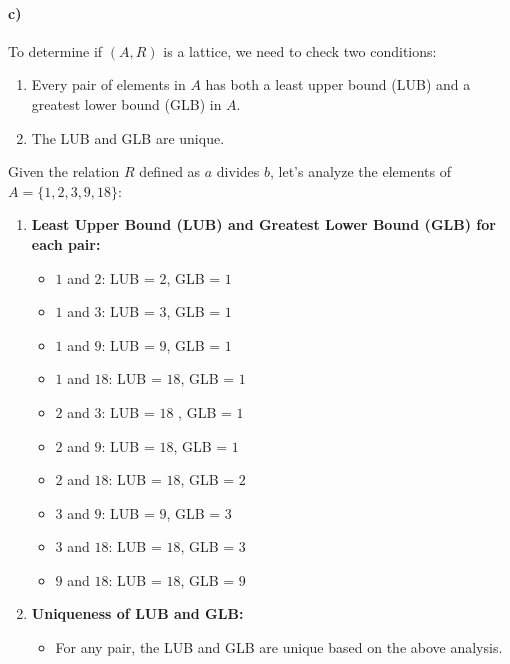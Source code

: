 \documentclass[12pt]{article}
\begin{document}
\paragraph{c)}

To determine if \( (A, R) \) is a lattice, we need to check two conditions:

\begin{enumerate}
    \item Every pair of elements in \( A \) has both a least upper bound (LUB) and a greatest lower bound (GLB) in \( A \).
    \item The LUB and GLB are unique.
\end{enumerate}

Given the relation \( R \) defined as \( a \) divides \( b \), let's analyze the elements of \( A = \{1, 2, 3, 9, 18\} \):

\begin{enumerate}
    \item \textbf{Least Upper Bound (LUB) and Greatest Lower Bound (GLB) for each pair:}
    \begin{itemize}
        \item \( 1 \) and \( 2 \): LUB = \( 2 \), GLB = \( 1 \)
        \item \( 1 \) and \( 3 \): LUB = \( 3 \), GLB = \( 1 \)
        \item \( 1 \) and \( 9 \): LUB = \( 9 \), GLB = \( 1 \)
        \item \( 1 \) and \( 18 \): LUB = \( 18 \), GLB = \( 1 \)
        \item \( 2 \) and \( 3 \): LUB = \( 18 \) , GLB = \( 1 \)
        \item \( 2 \) and \( 9 \): LUB = \( 18 \), GLB = \( 1 \)
        \item \( 2 \) and \( 18 \): LUB = \( 18 \), GLB = \( 2 \)
        \item \( 3 \) and \( 9 \): LUB = \( 9 \), GLB = \( 3 \)
        \item \( 3 \) and \( 18 \): LUB = \( 18 \), GLB = \( 3 \)
        \item \( 9 \) and \( 18 \): LUB = \( 18 \), GLB = \( 9 \)
    \end{itemize}
    \item \textbf{Uniqueness of LUB and GLB:}
    \begin{itemize}
        \item For any pair, the LUB and GLB are unique based on the above analysis.
    \end{itemize}
\end{enumerate}
\end{document}
